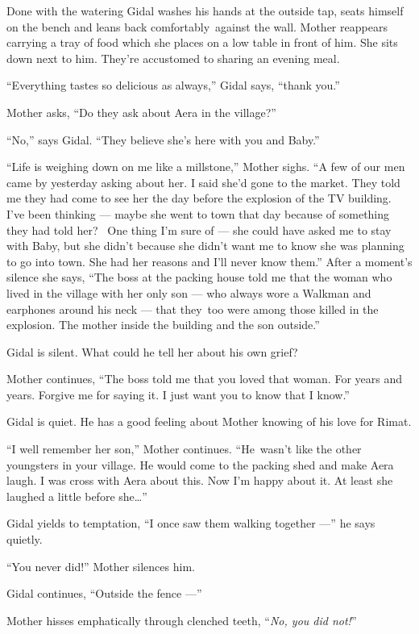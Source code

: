\documentclass[twoside,11pt,openany]{book}
\begin{document}
Done with the watering Gidal washes his hands at the outside tap, seats himself on the bench and leans back
comfortably~against the wall. Mother reappears carrying a tray of food which she places on a low table in front of him.
She sits down next to him. They're accustomed to sharing an evening meal.

``Everything tastes so delicious as always,'' Gidal says, ``thank
you.''

Mother asks, ``Do they ask about Aera in the village?''

``No,'' says Gidal. ``They believe she's here with you and Baby.''

``Life is weighing down on me like a millstone,'' Mother sighs. ``A few of our
men came by yesterday asking about her. I said she'd gone to the market. They told me they had come to see her the day
before the explosion of the TV building. I've been thinking --- maybe she went to town that day because of something they
had told her? ~One thing I'm sure of --- she could have asked me to stay with Baby, but she didn't because she didn't
want me to know she was planning to go into town. She had her reasons and I'll never know them.'' After a moment's
silence she says, ``The boss at the packing house told me that the woman who lived in the village with her
only son --- who always wore a Walkman and earphones around his neck --- that they~too were among those killed in
the explosion. The mother inside the building and the son outside.''

Gidal is silent. What could he tell her about his own grief?

Mother continues, ``The boss told me that you loved that woman. For years and years. Forgive me for saying
it. I just want you to know that I know.''

Gidal is quiet. He has a good feeling about Mother knowing of his love for Rimat.

``I well remember her son,'' Mother continues. ``He~wasn't like the other
youngsters in your village. He would come to the packing shed and make Aera laugh. I was cross with Aera about this.
Now I'm happy about it. At least she laughed a little before she{\ldots}''

Gidal yields to temptation, ``I once saw them walking together ---'' he says quietly.

``You never did!'' Mother silences him.

Gidal continues, ``Outside the fence ---''

Mother hisses emphatically through clenched teeth, ``\textit{No, you did not!}''
\end{document}
